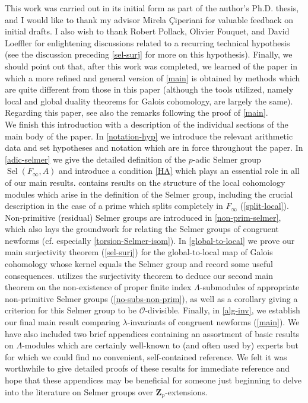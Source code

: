 \documentclass[12 pt]{amsart}
\theoremstyle{plain}
\theoremstyle{definition}
\numberwithin{equation}{section}
\numberwithin{table}{section}
\begin{document}
\indent This work was carried out in its initial form as part of the author's Ph.D. thesis, and I would like to thank my advisor Mirela \c{C}iperiani for valuable feedback on initial drafts. I also wish to thank Robert Pollack, Olivier Fouquet, and David Loeffler for enlightening discussions related to a recurring technical hypothesis (see the discussion preceding \cref{sel-surj} for more on this hypothesis). Finally, we should point out that, after this work was completed, we learned of the paper \cite{Hach11} in which a more refined and general version of \cref{main} is obtained by methods which are quite different from those in this paper (although the tools utilized, namely local and global duality theorems for Galois cohomology, are largely the same). Regarding this paper, see also the remarks following the proof of \cref{main}.\\%
\indent We finish this introduction with a description of the individual sections of the main body of the paper. In \cref{notation-hyp} we introduce the relevant arithmetic data and set hypotheses and notation which are in force throughout the paper. In \cref{adic-selmer} we give the detailed definition of the $p$-adic Selmer group $\operatorname{Sel}(F_\infty,A)$ and introduce a condition \cref{HA} which plays an essential role in all of our main results.  contains results on the structure of the local cohomology modules which arise in the definition of the Selmer group, including the crucial description in the case of a prime which splits completely in $F_\infty$ (\cref{split-local}). Non-primitive (residual) Selmer groups are introduced in \cref{non-prim-selmer}, which also lays the groundwork for relating the Selmer groups of congruent newforms (cf. especially \cref{torsion-Selmer-isom}). In \cref{global-to-local} we prove our main surjectivity theorem (\cref{sel-surj})  for the global-to-local map of Galois cohomology whose kernel equals the Selmer group and record some useful consequences.  utilizes the surjectivity theorem to deduce our second main theorem on the non-existence of proper finite index $\Lambda$-submodules of appropriate non-primitive Selmer groups (\cref{no-subs-non-prim}), as well as a corollary giving a criterion for this Selmer group to be $\mathscr{O}$-divisible. Finally, in \cref{alg-inv}, we establish our final main result comparing $\lambda$-invariants of congruent newforms (\cref{main}). We have also included two brief appendices containing an assortment of basic results on $\Lambda$-modules which are certainly well-known to (and often used by) experts but for which we could find no convenient, self-contained reference. We felt it was worthwhile to give detailed proofs of these results for immediate reference and hope that these appendices may be beneficial for someone just beginning to delve into the literature on Selmer groups over $\mathbf{Z}_p$-extensions.
\end{document}
